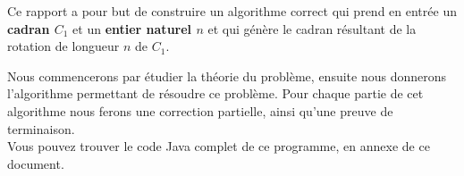 Ce rapport a pour but de construire un algorithme correct qui prend en entrée un \textbf{cadran $C_{1}$} et un \textbf{entier naturel $n$} et qui génère le cadran résultant de la rotation de longueur $n$ de $C_{1}$.

Nous commencerons par étudier la théorie du problème, ensuite nous donnerons l'algorithme permettant de résoudre ce problème. Pour chaque partie de cet algorithme nous  ferons une correction partielle, ainsi qu'une preuve de terminaison. \\

Vous pouvez trouver le code Java complet de ce programme, en annexe de ce document. \\